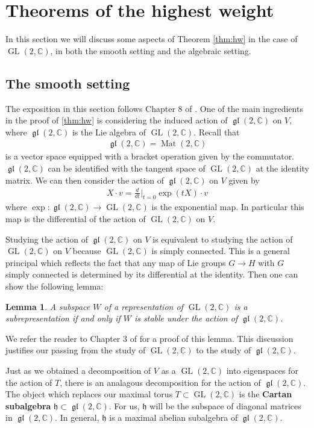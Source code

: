 \documentclass{amsart}
\DeclareMathOperator{\Mat}{Mat}
\DeclareMathOperator{\GL}{GL}
\newcommand{\C}{\mathbb{C}}
\newcommand{\mf}[1]{\mathfrak{#1}}
\DeclareMathOperator{\gl}{\mf{gl}}
\numberwithin{equation}{section}
\theoremstyle{plain} %
\newtheorem{lemma}[equation]{Lemma}
\theoremstyle{definition}
\theoremstyle{remark}
\begin{document}
\section{Theorems of the highest weight}
In this section we will discuss some aspects of Theorem \ref{thm:hw} in the case of $\GL(2,\C)$,
in both the smooth setting and the algebraic setting.

\subsection{The smooth setting}
The exposition in this section follows Chapter 8 of \cite{fulton}.
One of the main ingredients in the proof of \ref{thm:hw} is considering the induced action of $\gl(2,\C)$ on $V$,
where $\gl(2,\C)$ is the Lie algebra of $\GL(2,\C)$. Recall that \begin{align*}
	\gl(2,\C) = \Mat(2,\C)
\end{align*} is a vector space equipped with a bracket operation given by the commutator. $\gl(2,\C)$
can be identified with the tangent space of $\GL(2,\C)$ at the identity matrix. We can then consider the action of $\gl(2,\C)$ on $V$ given by \begin{align*}
	X\cdot v = \frac{d}{dt}\bigg\vert_{t=0} \exp(tX)\cdot v
\end{align*} where $\exp: \gl(2,\C)\to \GL(2,\C)$ is the exponential map. In particular this map is the differential of the action of $\GL(2,\C)$ on $V$.

\hfill

Studying the action of $\gl(2,\C)$ on $V$ is equivalent to studying the action of $\GL(2,\C)$ on $V$ because $\GL(2,\C)$ is simply
connected. This is a general principal which reflects the fact that any map of Lie groups $G\to H$
with $G$ simply connected is determined by its differential at the identity. Then one can show the following lemma:
\begin{lemma}\label{lemma:liealg}
	A subspace $W$ of a representation of $\GL(2,\C)$ is a subrepresentation if and only if $W$ is stable under the action of $\gl(2,\C)$.
\end{lemma}
We refer the reader to Chapter 3 of \cite{bourbaki} for a proof of this lemma.
This discussion justifies our passing from the study of $\GL(2,\C)$ to the study of $\gl(2,\C)$.

\hfill

Just as we obtained a decomposition of $V$ as a $\GL(2,\C)$ into eigenspaces for the action of $T$,
there is an analagous decomposition for the action of $\gl(2,\C)$.
The object which replaces our maximal torus $T\subset\GL(2,\C)$ is the \textbf{Cartan subalgebra} $\mf h\subset \gl(2,\C)$.
For us, $\mf h$ will be the subspace of diagonal matrices in $\gl(2,\C)$. In general, $\mf h$ is a maximal abelian subalgebra of $\gl(2,\C)$.
\end{document}
